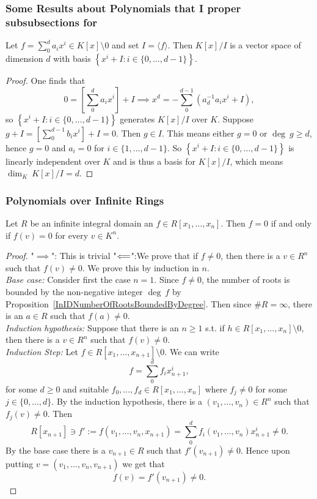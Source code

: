 \subsubsection{Some Results about Polynomials that I proper subsubsections for}
\begin{lemma}\label{DimensionOfQuotientSpace}
    Let $f=\sum_0^d a_ix^i \in K[x]\setminus0$ and set $I=\langle f\rangle$. Then $K[x]/I$ is a vector space of dimension $d$ with basis $\left\{x^i+I : i\in\{0,\dots,d-1\}\right\}$.
\end{lemma}
\begin{proof}
    One finds that 
    $$0 = \left[\sum_0^d a_ix^i\right] + I  \implies x^d = -\sum_0^{d-1} \left(a_d^{-1}a_ix^i+I\right),$$
    so $\left\{x^i+I : i\in\{0,\dots,d-1\}\right\}$ generates $K[x]/I$ over $K$. Suppose $g+I=\left[\sum_0^{d-1} b_ix^i\right] + I=0$. Then $g\in I$. This means either $g=0$ or $\deg \ g \geq d$, hence $g=0$ and $a_i = 0$ for $i\in\{1,\dots,d-1\}$. So $\left\{x^i+I : i\in\{0,\dots,d-1\}\right\}$ is linearly independent over $K$ and is thus a basis for $K[x]/I$, which means $\dim_K \ K[x]/I = d$.
\end{proof}
\subsubsection{Polynomials over Infinite Rings}
\begin{proposition}\label{OnInfiniteIDPolynomialVanishesEverywhereIfAndOnlyIfIsZero}
    Let $R$ be an infinite integral domain an $f\in R[x_1,\dots,x_n]$. Then $f = 0$ if and only if $f(v)=0$ for every $v\in K^n$. 
\end{proposition}
\begin{proof}
    "$\implies$": This is trivial
    "$\Longleftarrow$":We prove that if $f \neq 0$, then there is a $v\in R^n$ such that $f(v)\neq 0$. We prove this by induction in $n$.\\
    \textit{Base case:} Consider first the case $n = 1$. Since $f \neq 0$, the number of roots is bounded by the non-negative integer $\deg\ f$ by Proposition~\ref{InIDNumberOfRootsBoundedByDegree}. Then since $\#R=\infty$, there is an $a\in R$ such that $f(a)\neq 0$.\\ 
    \textit{Induction hypothesis:} Suppose that there is an $n \geq 1$ s.t. if $h\in R[x_1,\dots,x_n]\setminus 0 $, then there is a $v \in R^n$ such that $f(v)\neq 0$.\\
    \textit{Induction Step:} Let $f\in R[x_1,\dots,x_{n+1}]\setminus 0$. We can write 
    $$f = \sum_0^d f_ix_{n+1}^i,$$
    for some $d\geq 0$ and suitable $f_0,\dots,f_d\in R[x_1,\dots,x_n]$ where $f_j\neq 0$ for some $j\in \{0,\dots,d\}$. By the induction hypothesis, there is a $(v_1,\dots,v_n)\in R^n$ such that $f_j(v)\neq 0$. Then 
    $$R[x_{n+1}]\ni f':= f(v_1,\dots,v_n,x_{n+1}) = \sum_0^d f_i(v_1,\dots,v_n)x_{n+1}^i \neq 0.$$ 
    By the base case there is a $v_{n+1}\in R$ such that $f'(v_{n+1})\neq 0$. Hence upon putting $v= (v_1,\dots,v_n,v_{n+1})$ we get that 
    $$f(v) = f'(v_{n+1}) \neq 0.$$
\end{proof}
